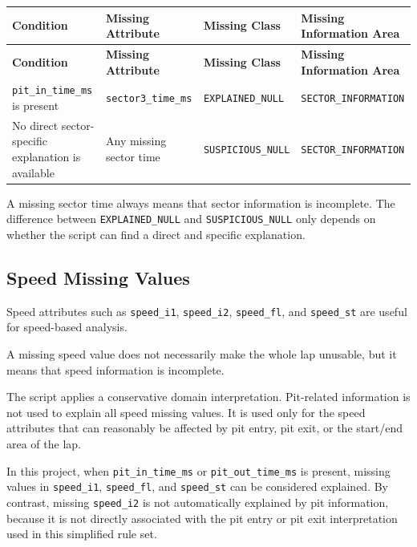 \documentclass[a4paper,11pt]{article}
\begin{document}
	
	\begin{longtable}{p{4.5cm}p{4cm}p{3.5cm}p{4cm}}
		\toprule
		\textbf{Condition} & \textbf{Missing Attribute} & \textbf{Missing Class} & \textbf{Missing Information Area} \\
		\midrule
		\endfirsthead
		
		\toprule
		\textbf{Condition} & \textbf{Missing Attribute} & \textbf{Missing Class} & \textbf{Missing Information Area} \\
		\midrule
		\endhead
		
		\texttt{pit\_in\_time\_ms} is present
		& \texttt{sector3\_time\_ms}
		& \texttt{EXPLAINED\_NULL}
		& \texttt{SECTOR\_INFORMATION} \\
		\midrule
		
		No direct sector-specific explanation is available
		& Any missing sector time
		& \texttt{SUSPICIOUS\_NULL}
		& \texttt{SECTOR\_INFORMATION} \\
		\bottomrule
	\end{longtable}
	
	A missing sector time always means that sector information is incomplete.
	The difference between \texttt{EXPLAINED\_NULL} and \texttt{SUSPICIOUS\_NULL} only depends on whether the script can find a direct and specific explanation.
	
	\subsection{Speed Missing Values}
	
	Speed attributes such as \texttt{speed\_i1}, \texttt{speed\_i2}, \texttt{speed\_fl}, and \texttt{speed\_st} are useful for speed-based analysis.
	
	A missing speed value does not necessarily make the whole lap unusable, but it means that speed information is incomplete.
	
	The script applies a conservative domain interpretation.
	Pit-related information is not used to explain all speed missing values.
	It is used only for the speed attributes that can reasonably be affected by pit entry, pit exit, or the start/end area of the lap.
	
	In this project, when \texttt{pit\_in\_time\_ms} or \texttt{pit\_out\_time\_ms} is present, missing values in \texttt{speed\_i1}, \texttt{speed\_fl}, and \texttt{speed\_st} can be considered explained.
	By contrast, missing \texttt{speed\_i2} is not automatically explained by pit information, because it is not directly associated with the pit entry or pit exit interpretation used in this simplified rule set.
	
\end{document}
